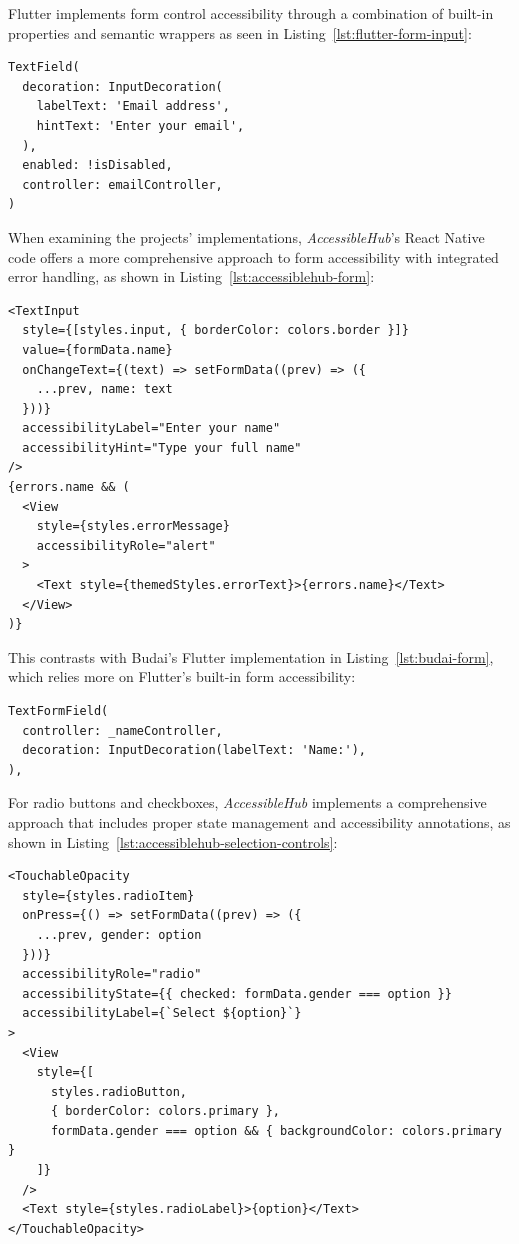 Flutter implements form control accessibility through a combination of built-in properties and semantic wrappers as seen in Listing~\ref{lst:flutter-form-input}:

\begin{lstlisting}[style=DartStyle, caption=Accessible form input in Flutter, label=lst:flutter-form-input]
TextField(
  decoration: InputDecoration(
    labelText: 'Email address',
    hintText: 'Enter your email',
  ),
  enabled: !isDisabled,
  controller: emailController,
)
\end{lstlisting}

\pagebreak

When examining the projects' implementations, \textit{AccessibleHub}'s React Native code offers a more comprehensive approach to form accessibility with integrated error handling, as shown in Listing~\ref{lst:accessiblehub-form}:

\begin{lstlisting}[style=ReactNativeStyle, caption=Form implementation in \textit{AccessibleHub}'s React Native code, label=lst:accessiblehub-form]
<TextInput
  style={[styles.input, { borderColor: colors.border }]}
  value={formData.name}
  onChangeText={(text) => setFormData((prev) => ({
    ...prev, name: text
  }))}
  accessibilityLabel="Enter your name"
  accessibilityHint="Type your full name"
/>
{errors.name && (
  <View 
    style={styles.errorMessage} 
    accessibilityRole="alert"
  >
    <Text style={themedStyles.errorText}>{errors.name}</Text>
  </View>
)}
\end{lstlisting}

\pagebreak

This contrasts with Budai's Flutter implementation in Listing~\ref{lst:budai-form}, which relies more on Flutter's built-in form accessibility:

\begin{lstlisting}[style=DartStyle, caption=Form implementation in Budai's Flutter code, label=lst:budai-form]
TextFormField(
  controller: _nameController,
  decoration: InputDecoration(labelText: 'Name:'),
),
\end{lstlisting}

For radio buttons and checkboxes, \textit{AccessibleHub} implements a comprehensive approach that includes proper state management and accessibility annotations, as shown in Listing~\ref{lst:accessiblehub-selection-controls}:

\begin{lstlisting}[style=ReactNativeStyle, caption=Selection controls in \textit{AccessibleHub}, label=lst:accessiblehub-selection-controls]
<TouchableOpacity
  style={styles.radioItem}
  onPress={() => setFormData((prev) => ({ 
    ...prev, gender: option 
  }))}
  accessibilityRole="radio"
  accessibilityState={{ checked: formData.gender === option }}
  accessibilityLabel={`Select ${option}`}
>
  <View
    style={[
      styles.radioButton,
      { borderColor: colors.primary },
      formData.gender === option && { backgroundColor: colors.primary }
    ]}
  />
  <Text style={styles.radioLabel}>{option}</Text>
</TouchableOpacity>
\end{lstlisting}

